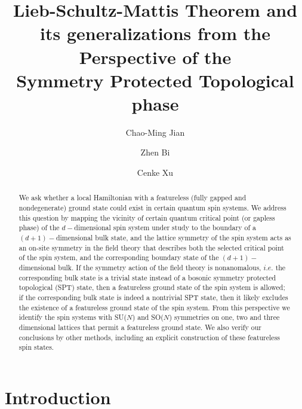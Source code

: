 \documentclass[aps,prb,twocolumn,superscriptaddress,showpacs]{revtex4}
\begin{document}
\title{Lieb-Schultz-Mattis Theorem and its generalizations from the Perspective of the \\ Symmetry Protected Topological phase}

\author{Chao-Ming Jian}
 

\author{Zhen Bi}

\author{Cenke Xu}


\begin{abstract}

We ask whether a local Hamiltonian with a featureless (fully
gapped and nondegenerate) ground state could exist in certain
quantum spin systems. We address this question by mapping the
vicinity of certain quantum critical point (or gapless phase) of
the $d-$dimensional spin system under study to the boundary of a
$(d+1)-$dimensional bulk state, and the lattice symmetry of the
spin system acts as an on-site symmetry in the field theory that
describes both the selected critical point of the spin system, and
the corresponding boundary state of the $(d+1)-$dimensional bulk.
If the symmetry action of the field theory is nonanomalous, $i.e.$
the corresponding bulk state is a trivial state instead of a
bosonic symmetry protected topological (SPT) state, then a
featureless ground state of the spin system is allowed; if the
corresponding bulk state is indeed a nontrivial SPT state, then it
likely excludes the existence of a featureless ground state of the
spin system. From this perspective we identify the spin systems
with SU($N$) and SO($N$) symmetries on one, two and three
dimensional lattices that permit a featureless ground state. We
also verify our conclusions by other methods, including an
explicit construction of these featureless spin states.

\end{abstract}

\pacs{}

\maketitle

\section{Introduction}
\end{document}
